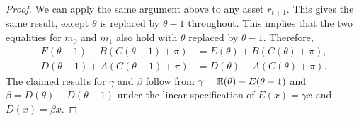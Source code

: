 \documentclass[11pt, letterpaper, twoside]{article}
\begin{document}
\begin{appendices}
\begin{proof}
We can apply the same argument above to any asset $r_{t+1}$. This gives the same result, except $\theta$ is replaced by $\theta -1$ throughout. 
This implies that the two equalities for $m_{0}$ and $m_{1}$ also hold with $\theta $ replaced by $\theta -1$. 
Therefore, 
%
\begin{align*}
    E(\theta -1)+B\left( C\left( \theta -1\right) +\pi \right)  
%
    &= E(\theta)+B\left( C\left( \theta \right) +\pi \right) , \\
%
    D\left( \theta -1\right) +A\left( C\left( \theta -1\right) +\pi \right) 
%
    &= D\left( \theta \right) +A\left( C\left( \theta \right) +\pi \right).
\end{align*}
%
The claimed results for $\gamma $ and $\beta $ follow from $\gamma = \operatorname{\mathbb{E}}(\theta)-E(\theta -1)$ and $\beta =D(\theta )-D(\theta -1)$ under the linear specification of $E(x)=\gamma x$ and $D(x)=\beta x$.

\end{proof}

\end{appendices}
\end{document}
